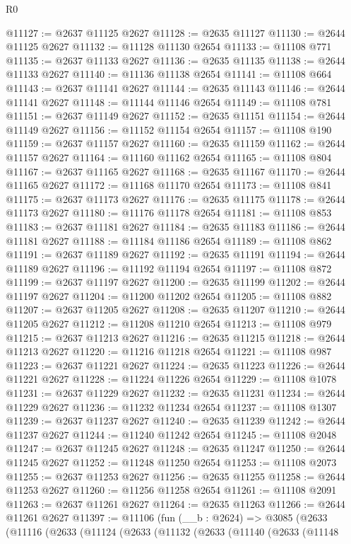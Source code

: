 \begin{lexlean}{R0}
\begin{coremodule}
@11127 := @2637 @11125 @2627
@11128 := @2635 @11127
@11130 := @2644 @11125 @2627
@11132 := @11128 @11130 @2654
@11133 := @11108 @771
@11135 := @2637 @11133 @2627
@11136 := @2635 @11135
@11138 := @2644 @11133 @2627
@11140 := @11136 @11138 @2654
@11141 := @11108 @664
@11143 := @2637 @11141 @2627
@11144 := @2635 @11143
@11146 := @2644 @11141 @2627
@11148 := @11144 @11146 @2654
@11149 := @11108 @781
@11151 := @2637 @11149 @2627
@11152 := @2635 @11151
@11154 := @2644 @11149 @2627
@11156 := @11152 @11154 @2654
@11157 := @11108 @190
@11159 := @2637 @11157 @2627
@11160 := @2635 @11159
@11162 := @2644 @11157 @2627
@11164 := @11160 @11162 @2654
@11165 := @11108 @804
@11167 := @2637 @11165 @2627
@11168 := @2635 @11167
@11170 := @2644 @11165 @2627
@11172 := @11168 @11170 @2654
@11173 := @11108 @841
@11175 := @2637 @11173 @2627
@11176 := @2635 @11175
@11178 := @2644 @11173 @2627
@11180 := @11176 @11178 @2654
@11181 := @11108 @853
@11183 := @2637 @11181 @2627
@11184 := @2635 @11183
@11186 := @2644 @11181 @2627
@11188 := @11184 @11186 @2654
@11189 := @11108 @862
@11191 := @2637 @11189 @2627
@11192 := @2635 @11191
@11194 := @2644 @11189 @2627
@11196 := @11192 @11194 @2654
@11197 := @11108 @872
@11199 := @2637 @11197 @2627
@11200 := @2635 @11199
@11202 := @2644 @11197 @2627
@11204 := @11200 @11202 @2654
@11205 := @11108 @882
@11207 := @2637 @11205 @2627
@11208 := @2635 @11207
@11210 := @2644 @11205 @2627
@11212 := @11208 @11210 @2654
@11213 := @11108 @979
@11215 := @2637 @11213 @2627
@11216 := @2635 @11215
@11218 := @2644 @11213 @2627
@11220 := @11216 @11218 @2654
@11221 := @11108 @987
@11223 := @2637 @11221 @2627
@11224 := @2635 @11223
@11226 := @2644 @11221 @2627
@11228 := @11224 @11226 @2654
@11229 := @11108 @1078
@11231 := @2637 @11229 @2627
@11232 := @2635 @11231
@11234 := @2644 @11229 @2627
@11236 := @11232 @11234 @2654
@11237 := @11108 @1307
@11239 := @2637 @11237 @2627
@11240 := @2635 @11239
@11242 := @2644 @11237 @2627
@11244 := @11240 @11242 @2654
@11245 := @11108 @2048
@11247 := @2637 @11245 @2627
@11248 := @2635 @11247
@11250 := @2644 @11245 @2627
@11252 := @11248 @11250 @2654
@11253 := @11108 @2073
@11255 := @2637 @11253 @2627
@11256 := @2635 @11255
@11258 := @2644 @11253 @2627
@11260 := @11256 @11258 @2654
@11261 := @11108 @2091
@11263 := @2637 @11261 @2627
@11264 := @2635 @11263
@11266 := @2644 @11261 @2627
@11397 := @11106
    (fun (__b : @2624) =>
    @3085
      (@2633
        (@11116
          (@2633
            (@11124
              (@2633
                (@11132
                  (@2633
                    (@11140
                      (@2633
                        (@11148

\end{coremodule}
\end{lexlean}

